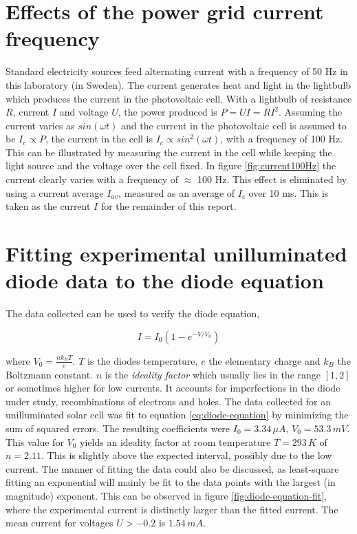 \documentclass[a4paper,twoside=false,abstract=false,numbers=noenddot,
titlepage=false,headings=small,parskip=half,version=last]{scrartcl}
\begin{document}
\section{Effects of the power grid current frequency}

Standard electricity sources feed alternating current with a frequency of 50 Hz in this laboratory (in Sweden).
The current generates heat and light in the lightbulb which produces the current in the photovoltaic cell.
With a lightbulb of resistance $R$, current $I$ and voltage $U$, the power produced is $P=UI=RI^2$.
Assuming the current varies as $sin(\omega t)$ and the current in the photovoltaic cell is assumed to be $I_{c}\propto P$,
the current in the cell is $I_c \propto sin^2(\omega t)$, with a frequency of 100 Hz.
This can be illustrated by measuring the current in the cell while keeping the light source and the voltage over the cell fixed.
In figure \ref{fig:current100Hz} the current clearly varies with a frequency of $\approx$ 100 Hz.
This effect is eliminated by using a current average $I_{av}$, measured as an average of $I_c$ over 10 ms.
This is taken as the current $I$ for the remainder of this report.

\section{Fitting experimental unilluminated diode data to the diode equation}
The data collected can be used to verify the diode equation,

\begin{equation}
    I = I_0 \left(1-e^{-V/V_0}\right)\label{eq:diode-equation}
\end{equation}

where $V_0 = \frac{nk_BT}{e}$.
$T$ is the diodes temperature, $e$ the elementary charge and $k_B$ the Boltzmann constant.
$n$ is the \emph{ideality factor} which usually lies in the range $[1,2]$ or sometimes higher for low currents.
It accounts for imperfections in the diode under study, recombinations of electrons and holes.
The data collected for an unilluminated solar cell was fit to equation \eqref{eq:diode-equation} by minimizing the sum of squared errors.
The resulting coefficients were $I_0=3.34\,\mu A$, $V_0=53.3\,mV$.
This value for $V_0$ yields an ideality factor at room temperature $T=293\,K$ of $n=2.11$.
This is slightly above the expected interval, possibly due to the low current.
The manner of fitting the data could also be discussed, as least-square fitting an exponential will mainly be fit to the data points with the largest (in magnitude) exponent.
This can be observed in figure \ref{fig:diode-equation-fit}, where the experimental current is distinctly larger than the fitted current.
The mean current for voltages $U>-0.2$ is $1.54\,mA$.
\end{document}
